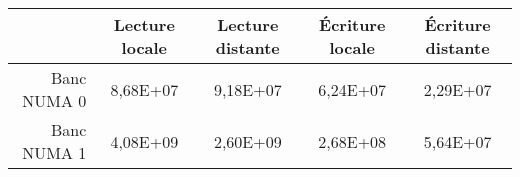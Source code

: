 \begin{center}
  \begin{tabular}{|r|c|c|c|c|}
    \hline
                & Lecture locale & Lecture distante & \'Ecriture locale & \'Ecriture distante \\
    \hline
    Banc NUMA 0 & 8,68E+07  &  9,18E+07  &  6,24E+07  &  2,29E+07 \\
    Banc NUMA 1 & 4,08E+09  &  2,60E+09  &  2,68E+08  &  5,64E+07 \\
    \hline
  \end{tabular}
  \label{tab:numa_spmv}
\end{center}
